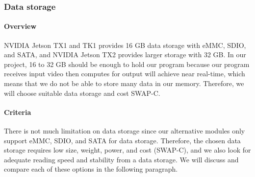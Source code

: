 \subsubsection{Data storage}
\paragraph{Overview}
NVIDIA Jetson TX1 and TK1 provides 16 GB data storage with eMMC, SDIO, and SATA, and NVIDIA 
Jetson TX2 provides larger storage with 32 GB. In our project, 16 to 32 GB should be enough to 
hold our program because our program receives input video then computes for output will achieve 
near real-time, which means that we do not be able to store many data in our memory. Therefore, 
we will choose suitable data storage and cost SWAP-C. \\


\paragraph{Criteria}
There is not much limitation on data storage since our alternative modules only support eMMC, SDIO, 
and SATA for data storage. Therefore, the chosen data storage requires low size, weight, power, and
 cost (SWAP-C), and we also look for adequate reading speed and stability from a data storage. We 
 will discuss and compare each of these options in the following paragraph. \\

